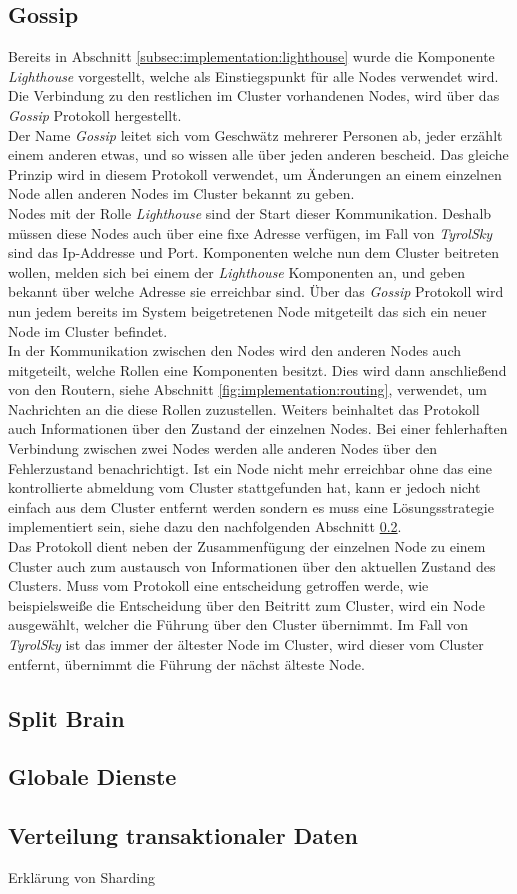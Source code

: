 \subsection{Gossip}
\label{subsec:implementation:gossip}
Bereits in Abschnitt \ref{subsec:implementation:lighthouse} wurde die Komponente \textit{Lighthouse} vorgestellt, welche als Einstiegspunkt für alle Nodes verwendet wird. Die Verbindung zu den restlichen im Cluster vorhandenen Nodes, wird über das \textit{Gossip} Protokoll hergestellt. \\
Der Name \textit{Gossip} leitet sich vom Geschwätz mehrerer Personen ab, jeder erzählt einem anderen etwas, und so wissen alle über jeden anderen  bescheid. Das gleiche Prinzip wird in diesem Protokoll verwendet, um Änderungen an einem einzelnen Node allen anderen Nodes im Cluster bekannt zu geben. \\
Nodes mit der Rolle \textit{Lighthouse} sind der Start dieser Kommunikation. Deshalb müssen diese Nodes auch über eine fixe Adresse verfügen, im Fall von \textit{TyrolSky} sind das Ip-Addresse und Port. Komponenten welche nun dem Cluster beitreten wollen, melden sich bei einem der \textit{Lighthouse} Komponenten an, und geben bekannt über welche Adresse sie erreichbar sind. Über das \textit{Gossip} Protokoll wird nun jedem bereits im System beigetretenen Node mitgeteilt das sich ein neuer Node im Cluster befindet. \\
In der Kommunikation zwischen den Nodes wird den anderen Nodes auch mitgeteilt, welche Rollen eine Komponenten besitzt. Dies wird dann anschließend von den Routern, siehe Abschnitt \ref{fig:implementation:routing}, verwendet, um Nachrichten an die diese Rollen zuzustellen. Weiters beinhaltet das Protokoll auch Informationen über den Zustand der einzelnen Nodes. Bei einer fehlerhaften Verbindung zwischen zwei Nodes werden alle anderen Nodes über den Fehlerzustand benachrichtigt. Ist ein Node nicht mehr erreichbar ohne das eine kontrollierte abmeldung vom Cluster stattgefunden hat, kann er jedoch nicht einfach aus dem Cluster entfernt werden sondern es muss eine Lösungsstrategie implementiert sein, siehe dazu den nachfolgenden Abschnitt \ref{subsec:implementation:splitBrain}. \\ 
Das Protokoll dient neben der Zusammenfügung der einzelnen Node zu einem Cluster auch zum austausch von Informationen über den aktuellen Zustand des Clusters. Muss vom Protokoll eine entscheidung getroffen werde, wie beispielsweiße die Entscheidung über den Beitritt zum Cluster, wird ein Node ausgewählt, welcher die Führung über den Cluster übernimmt. Im Fall von \textit{TyrolSky} ist das immer der ältester Node im Cluster, wird dieser vom Cluster entfernt, übernimmt die Führung der nächst älteste Node.  

\subsection{Split Brain} 
\label{subsec:implementation:splitBrain}

\subsection{Globale Dienste}
\label{subsec:implementation:singeltons}

\subsection{Verteilung transaktionaler Daten}
\label{subsec:implementation:akkaSharding}
Erklärung von Sharding
